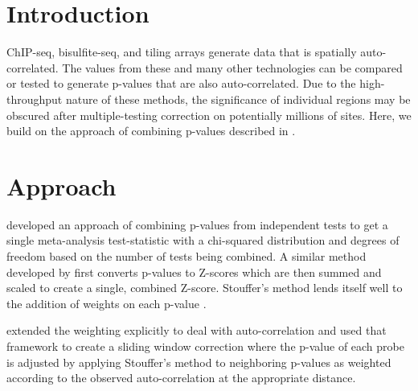 \documentclass{bioinfo}
\begin{document}
\section{Introduction}
ChIP-seq, bisulfite-seq, and tiling arrays generate data that is spatially
auto-correlated. The values from these and many other technologies can be
compared or tested to generate p-values that are also auto-correlated. Due to the
high-throughput nature of these methods, the significance of individual regions
may be obscured after multiple-testing correction on potentially millions of sites.
Here, we build on the approach of combining p-values described in \citep{Kechris2010}.

\section{Approach}

\citep{Fisher} developed an approach of combining p-values from independent tests
to get a single meta-analysis test-statistic with a chi-squared distribution 
and degrees of freedom based on the number of tests being combined.
A similar method developed by \citep{Stouffer} first converts p-values
to Z-scores which are then summed and scaled to create a single, combined Z-score.
Stouffer's method lends itself well to the addition of weights on each p-value
\citep{Liptak}.

\citep{Zaykin} extended the weighting explicitly to deal with auto-correlation and
\citep{Kechris2010} used that framework to create a sliding window correction where
the p-value of each probe is adjusted by applying Stouffer's method to neighboring
p-values as weighted according to the observed auto-correlation at the appropriate
distance.
\end{document}
